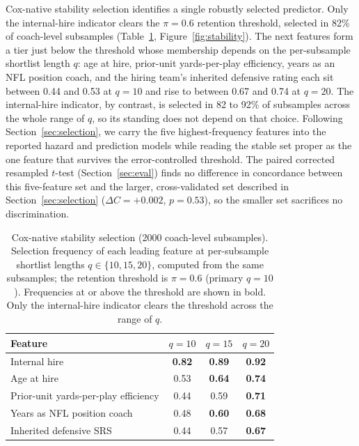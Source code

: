 \documentclass[USenglish]{article}
\theoremstyle{dgthm}
\theoremstyle{dgdef}
\begin{document}
Cox-native stability selection identifies a single robustly selected predictor. Only the internal-hire indicator clears the $\pi = 0.6$ retention threshold, selected in 82\% of coach-level subsamples (Table~\ref{tab:stability}, Figure~\ref{fig:stability}). The next features form a tier just below the threshold whose membership depends on the per-subsample shortlist length $q$: age at hire, prior-unit yards-per-play efficiency, years as an NFL position coach, and the hiring team's inherited defensive rating each sit between 0.44 and 0.53 at $q = 10$ and rise to between 0.67 and 0.74 at $q = 20$. The internal-hire indicator, by contrast, is selected in 82 to 92\% of subsamples across the whole range of $q$, so its standing does not depend on that choice. Following Section~\ref{sec:selection}, we carry the five highest-frequency features into the reported hazard and prediction models while reading the stable set proper as the one feature that survives the error-controlled threshold. The paired corrected resampled $t$-test (Section~\ref{sec:eval}) finds no difference in concordance between this five-feature set and the larger, cross-validated set described in Section~\ref{sec:selection} ($\Delta C = +0.002$, $p = 0.53$), so the smaller set sacrifices no discrimination.

\begin{table}[!ht]
\caption{Cox-native stability selection (2000 coach-level subsamples). Selection frequency of each leading feature at per-subsample shortlist lengths $q \in \{10, 15, 20\}$, computed from the same subsamples; the retention threshold is $\pi = 0.6$ (primary $q = 10$). Frequencies at or above the threshold are shown in bold. Only the internal-hire indicator clears the threshold across the range of $q$.}
\label{tab:stability}
\small
\begin{tabular}{lccc}
\toprule
Feature & $q = 10$ & $q = 15$ & $q = 20$ \\
\midrule
Internal hire & \textbf{0.82} & \textbf{0.89} & \textbf{0.92} \\
Age at hire & 0.53 & \textbf{0.64} & \textbf{0.74} \\
Prior-unit yards-per-play efficiency & 0.44 & 0.59 & \textbf{0.71} \\
Years as NFL position coach & 0.48 & \textbf{0.60} & \textbf{0.68} \\
Inherited defensive SRS & 0.44 & 0.57 & \textbf{0.67} \\
\bottomrule
\end{tabular}
\end{table}
\end{document}

